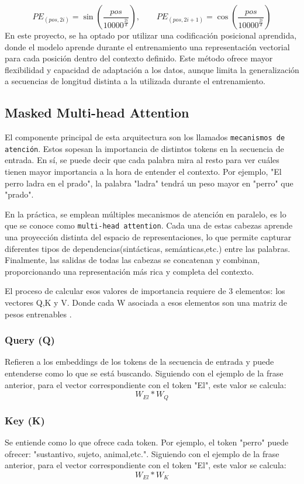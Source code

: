 \documentclass[11pt]{book}
\begin{document}
    \[
    PE_{(pos, 2i)} = \sin\!\left(\frac{pos}{10000^{\tfrac{2i}{d}}}\right), 
    \qquad
    PE_{(pos, 2i+1)} = \cos\!\left(\frac{pos}{10000^{\tfrac{2i}{d}}}\right)
    \]
En este proyecto, se ha optado por utilizar una codificación posicional aprendida, donde el modelo aprende durante el entrenamiento una representación vectorial para cada posición dentro del contexto definido. Este método ofrece mayor flexibilidad y capacidad de adaptación a los datos, aunque limita la generalización a secuencias de longitud distinta a la utilizada durante el entrenamiento.

\subsection{Masked Multi-head Attention}\label{subsec:multihead}

El componente principal de esta arquitectura son los llamados \texttt{mecanismos de atención}. Estos sopesan la importancia de distintos tokens en la secuencia de entrada. En sí, se puede decir que cada palabra mira al resto para ver cuáles tienen mayor importancia a la hora de entender el contexto. Por ejemplo, "El perro ladra en el prado", la palabra "ladra" tendrá un peso mayor en "perro" que "prado". 

En la práctica, se emplean múltiples mecanismos de atención en paralelo, es lo que se conoce como \texttt{multi-head attention}. Cada una de estas cabezas aprende una proyección distinta del espacio de representaciones, lo que permite capturar diferentes tipos de dependencias(sintácticas, semánticas,etc.) entre las palabras. Finalmente, las salidas de todas las cabezas se concatenan y combinan, proporcionando una representación más rica y completa del contexto.

El proceso de calcular esos valores de importancia requiere de 3 elementos: los vectores Q,K y V. Donde cada W asociada a esos elementos son una matriz de pesos entrenables \parencite{analytics2020qkv}.

\subsubsection{Query (Q)}
Refieren a los embeddings de los tokens de la secuencia de entrada y puede entenderse como lo que se está buscando. Siguiendo con el ejemplo de la frase anterior, para el vector correspondiente con el token "El", este valor se calcula: \[W_{El} * W_{Q}\]

\subsubsection{Key (K)}
Se entiende como lo que ofrece cada token. Por ejemplo, el token "perro" puede ofrecer: "sustantivo, sujeto, animal,etc.". Siguiendo con el ejemplo de la frase anterior, para el vector correspondiente con el token "El", este valor se calcula: \[W_{El} * W_{K}\]
\end{document}
